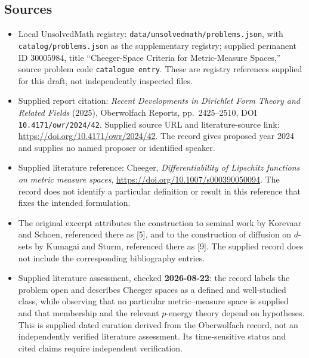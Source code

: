 \documentclass[11pt]{article}
\begin{document}
\subsection{Sources}
\begin{itemize}
\item Local UnsolvedMath registry: \texttt{data/unsolvedmath/problems.json}, with \texttt{catalog/problems.json} as the supplementary registry; supplied permanent ID \(30005984\), title ``Cheeger-Space Criteria for Metric-Measure Spaces,'' source problem code \texttt{catalogue entry}. These are registry references supplied for this draft, not independently inspected files.
\item Supplied report citation: \emph{Recent Developments in Dirichlet Form Theory and Related Fields} (2025), Oberwolfach Reports, pp.\ 2425--2510, DOI \texttt{10.4171/owr/2024/42}. Supplied source URL and literature-source link: \url{https://doi.org/10.4171/owr/2024/42}. The record gives proposed year 2024 and supplies no named proposer or identified speaker.
\item Supplied literature reference: Cheeger, \emph{Differentiability of Lipschitz functions on metric measure spaces}, \url{https://doi.org/10.1007/s000390050094}. The record does not identify a particular definition or result in this reference that fixes the intended formulation.
\item The original excerpt attributes the construction to seminal work by Korevaar and Schoen, referenced there as [5], and to the construction of diffusion on \(d\)-sets by Kumagai and Sturm, referenced there as [9]. The supplied record does not include the corresponding bibliography entries.
\item Supplied literature assessment, checked \textbf{2026-08-22}: the record labels the problem open and describes Cheeger spaces as a defined and well-studied class, while observing that no particular metric--measure space is supplied and that membership and the relevant \(p\)-energy theory depend on hypotheses. This is supplied dated curation derived from the Oberwolfach record, not an independently verified literature assessment. Its time-sensitive status and cited claims require independent verification.
\end{itemize}
\end{document}
